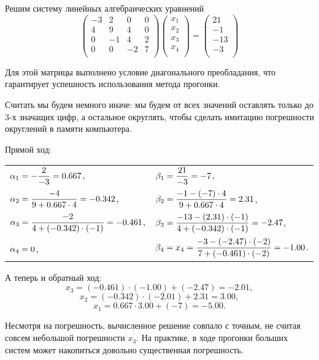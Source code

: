 \documentclass{article}
\begin{document}
\begin{example}\label{eq:tridiagonal_matrix_method_example}
	Решим систему линейных алгебраических уравнений
	\[
		\begin{pmatrix}
			-3	& 2	& 0	& 0	\\
			4	& 9	& 4	& 0	\\
			0	& -1	& 4	& 2	\\
			0	& 0	& -2	& 7	\\
		\end{pmatrix}
		\begin{pmatrix}
			x_1 \\
			x_2 \\
			x_3 \\
			x_4 \\
		\end{pmatrix}
		=
		\begin{pmatrix}
			21  \\
			-1  \\
			-13 \\
			-3  \\
		\end{pmatrix}
	\]

	Для этой матрицы выполнено условие диагонального преобладания, что
	гарантирует успешность использования метода прогонки.

	Считать мы будем немного иначе: мы будем от всех значений оставлять
	только до 3-х значащих цифр, а остальное округлять, чтобы сделать
	имитацию погрешности округлений в памяти компьютера.

	Прямой ход:

	\begin{tabular}{*{2}{l}}
		\vspace{4mm}
		$\mathlarger{\alpha_1=-\frac{2}{-3}=0.667}$, &
			$\mathlarger{\beta_1=\frac{21}{-3}=-7}$, \\
		\vspace{4mm}
		$\mathlarger{\alpha_2=\frac{-4}{9+0.667\cdot 4}}=-0.342$, &
			$\mathlarger{\beta_2=\frac{-1-(-7)\cdot 4}{9+0.667\cdot 4}=
			2.31}$, \\
		\vspace{4mm}
		$\mathlarger{\alpha_3=\frac{-2}{4+(-0.342)\cdot (-1)}}=-0.461$, &
			$\mathlarger{\beta_3=\frac{-13-(2.31)\cdot (-1)}
			{4+(-0.342)\cdot (-1)}=-2.47}$, \\
		$\mathlarger{\alpha_4=0}$, &
			$\mathlarger{\beta_4=x_4=\frac{-3-(-2.47)\cdot (-2)}
			{7+(-0.461)\cdot (-2)}=-1.00}$. \\
	\end{tabular}

	А теперь и обратный ход:
	\[x_3=(-0.461)\cdot (-1.00)+(-2.47)=-2.01,\]
	\[x_2=(-0.342)\cdot (-2.01)+2.31=3.00,\]
	\[x_1=0.667\cdot 3.00+(-7)=-5.00.\]

	Несмотря на погрешность, вычисленное решение совпало с точным, не считая
	совсем небольшой погрешности $x_3$. На практике, в ходе прогонки больших
	систем может накопиться довольно существенная погрешность.
\end{example}
\end{document}
